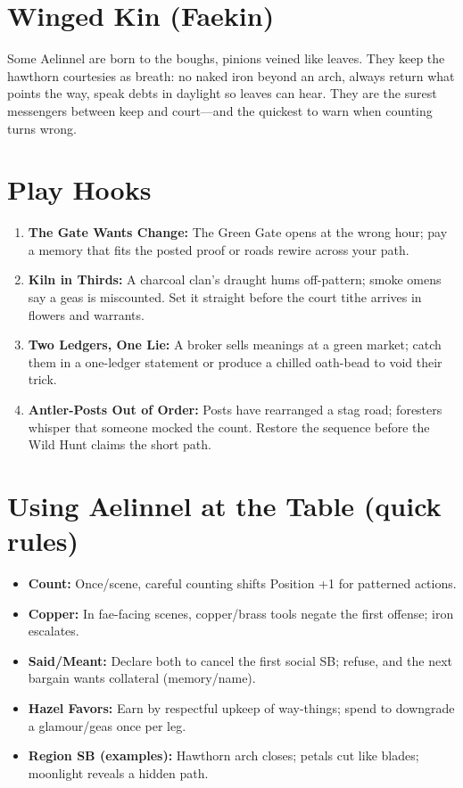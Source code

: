\documentclass[11pt]{book}
\begin{document}
\section*{Winged Kin (Faekin)}
Some Aelinnel are born to the boughs, pinions veined like leaves. They keep the hawthorn courtesies as breath: no naked iron beyond an arch, always return what points the way, speak debts in daylight so leaves can hear. They are the surest messengers between keep and court---and the quickest to warn when counting turns wrong.

\section*{Play Hooks}
\begin{enumerate}
    \item \textbf{The Gate Wants Change:} The Green Gate opens at the wrong hour; pay a memory that fits the posted proof or roads rewire across your path.
    \item \textbf{Kiln in Thirds:} A charcoal clan's draught hums off-pattern; smoke omens say a geas is miscounted. Set it straight before the court tithe arrives in flowers and warrants.
    \item \textbf{Two Ledgers, One Lie:} A broker sells meanings at a green market; catch them in a one-ledger statement or produce a chilled oath-bead to void their trick.
    \item \textbf{Antler-Posts Out of Order:} Posts have rearranged a stag road; foresters whisper that someone mocked the count. Restore the sequence before the Wild Hunt claims the short path.
\end{enumerate}

\section*{Using Aelinnel at the Table (quick rules)}
\begin{itemize}
    \item \textbf{Count:} Once/scene, careful counting shifts Position +1 for patterned actions.
    \item \textbf{Copper:} In fae-facing scenes, copper/brass tools negate the first offense; iron escalates.
    \item \textbf{Said/Meant:} Declare both to cancel the first social SB; refuse, and the next bargain wants collateral (memory/name).
    \item \textbf{Hazel Favors:} Earn by respectful upkeep of way-things; spend to downgrade a glamour/geas once per leg.
    \item \textbf{Region SB (examples):} Hawthorn arch closes; petals cut like blades; moonlight reveals a hidden path.
\end{itemize}
\end{document}
